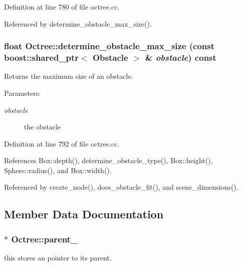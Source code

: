 Definition at line 780 of file octree.cc.

Referenced by determine\_\-obstacle\_\-max\_\-size().\hypertarget{class_octree_295852d7bca479a4abf01c579d2e93ae}{
\subsubsection[determine\_\-obstacle\_\-max\_\-size]{\setlength{\rightskip}{0pt plus 5cm}float Octree::determine\_\-obstacle\_\-max\_\-size (const boost::shared\_\-ptr$<$ Obstacle $>$ \& {\em obstacle}) const}}
\label{class_octree_295852d7bca479a4abf01c579d2e93ae}


Returns the maximum size of an obstacle. 

\begin{Desc}
\item[Parameters:]
\begin{description}
\item[{\em obstacle}]the obstacle \end{description}
\end{Desc}


Definition at line 792 of file octree.cc.

References Box::depth(), determine\_\-obstacle\_\-type(), Box::height(), Sphere::radius(), and Box::width().

Referenced by create\_\-node(), does\_\-obstacle\_\-fit(), and scene\_\-dimensions().

\subsection{Member Data Documentation}
\hypertarget{class_octree_513527d29f670449b0a665625d476ad6}{
\subsubsection[parent\_\-]{$\ast$ {\bf Octree::parent\_\-}}}
\label{class_octree_513527d29f670449b0a665625d476ad6}


this stores an pointer to its parent. 

